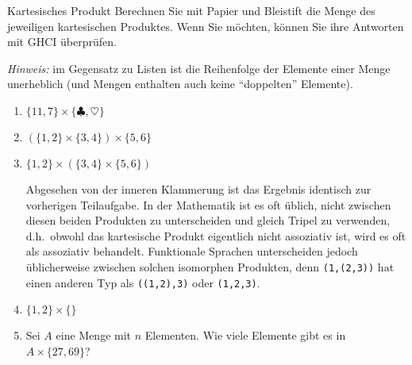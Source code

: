 \documentclass[11pt]{article}
\begin{document}


\begin{aufgabe}{Kartesisches Produkt}\label{kartesischesProdukt}
Berechnen Sie mit Papier und Bleistift die Menge des jeweiligen
kartesischen Produktes. 
Wenn Sie möchten, können Sie ihre Antworten mit GHCI überprüfen.

\emph{Hinweis:} im Gegensatz zu Listen ist 
      die Reihenfolge der Elemente einer Menge
      unerheblich (und Mengen enthalten auch keine ``doppelten'' Elemente).
\begin{enumerate}
 \item $\{11, 7\} \times \{\clubsuit, \heartsuit\}$


  \item $(\{1, 2\} \times \{3, 4\}) \times \{5,6\}$

  \item $\{1, 2\} \times (\{3, 4\} \times \{5,6\})$
    \begin{loesung}
      Abgesehen von der inneren Klammerung ist
      das Ergebnis identisch zur vorherigen Teilaufgabe.
      In der Mathematik ist es oft üblich, nicht zwischen diesen beiden Produkten zu unterscheiden und 
      gleich Tripel zu verwenden,
      d.h.\ obwohl das kartesische Produkt eigentlich nicht assoziativ ist, wird es oft als assoziativ behandelt.
      Funktionale Sprachen unterscheiden jedoch üblicherweise zwischen solchen isomorphen Produkten,
      denn \verb|(1,(2,3))| hat einen anderen Typ als \verb|((1,2),3)| oder \verb|(1,2,3)|.
    \end{loesung}
  
  \item $\{1, 2\} \times \{\}$
    
  \item Sei $A$ eine Menge mit $n$ Elementen. Wie viele Elemente gibt es in $A \times \{27,69\}$?
  
\end{enumerate}
\end{aufgabe}
\end{document}
